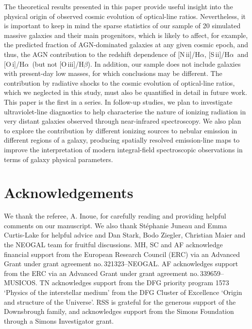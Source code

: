 \documentclass[fleqn,usenatbib]{mnras}
\newcommand{\oiiihb}{\hbox{[O\,{\sc iii}]/H$\beta$}}
\newcommand{\niiha}{\hbox{[N\,{\sc ii}]/H$\alpha$}}
\newcommand{\siiha}{\hbox{[S\,{\sc ii}]/H$\alpha$}}
\newcommand{\oiha}{\hbox{[O\,{\sc i}]/H$\alpha$}}
\begin{document}
The theoretical results presented in this paper provide useful
insight into the physical origin of observed cosmic evolution of
optical-line ratios. Nevertheless, it is important to keep in mind
the sparse statistics of our sample of 20 simulated massive 
galaxies and their main progenitors, which is likely to affect, for 
example, the predicted fraction of AGN-dominated galaxies
at any given cosmic epoch, and thus, the AGN contribution to the 
redshift dependence of \niiha, \siiha\ and \oiha\ (but not
\oiiihb).  In addition, our sample does not include galaxies
with present-day low masses, for which conclusions may be
  different. The contribution by radiative shocks to the cosmic
evolution of  optical-line ratios, which we neglected in this study,
must also be  quantified in detail in future work. This paper is the
first in a series. In follow-up studies, we plan to investigate
ultraviolet-line  diagnostics to help characterise the nature of
ionizing radiation  in very distant galaxies observed through
near-infrared spectroscopy.  We also plan to explore the contribution
by different ionizing sources to nebular emission in different regions
of a galaxy,  producing spatially resolved emission-line maps to
improve the interpretation of modern integral-field spectroscopic
observations in terms of galaxy physical parameters.

\section*{Acknowledgements}

 We thank the referee, A. Inoue, for carefully reading and providing
helpful comments on our manuscript. We also 
thank St\'ephanie Juneau and Emma Curtis-Lake for helpful
  advice  and Dan Stark, Bodo Ziegler, Christian Maier and the NEOGAL
  team  for fruitful discussions. MH, SC and AF acknowledge financial
  support from the European Research Council (ERC) via an Advanced
  Grant under grant agreement no.\,321323--NEOGAL.  AF acknowledges
  support from the ERC via an Advanced Grant under grant  agreement
  no.\,339659--MUSICOS. TN acknowledges support from the DFG priority
  program 1573 `Physics of the interstellar medium' from the DFG
  Cluster of Excellence `Origin and structure of the Universe'. RSS
  is grateful for the generous support of  the Downsbrough family, and
  acknowledges support from the Simons Foundation  through a Simons
  Investigator grant.
\end{document}
